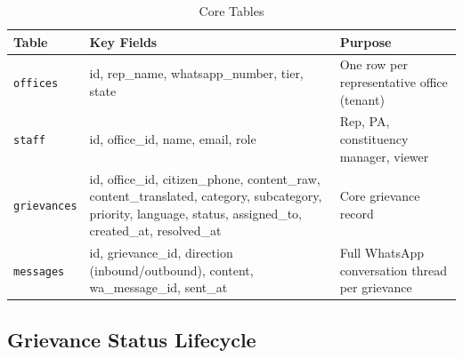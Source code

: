 \documentclass[12pt, a4paper]{article}
\begin{document}
\begin{table}[ht]
\centering
\caption{Core Tables}
\renewcommand{\arraystretch}{1.3}
\begin{tabularx}{\textwidth}{l l X}
\toprule
\rowcolor{pollitylightblue}
\textbf{Table} & \textbf{Key Fields} & \textbf{Purpose} \\
\midrule
\texttt{offices}    & id, rep\_name, whatsapp\_number, tier, state & One row per representative office (tenant) \\
\texttt{staff}      & id, office\_id, name, email, role & Rep, PA, constituency manager, viewer \\
\texttt{grievances} & id, office\_id, citizen\_phone, content\_raw, content\_translated, category, subcategory, priority, language, status, assigned\_to, created\_at, resolved\_at & Core grievance record \\
\texttt{messages}   & id, grievance\_id, direction (inbound/outbound), content, wa\_message\_id, sent\_at & Full WhatsApp conversation thread per grievance \\
\bottomrule
\end{tabularx}
\end{table}

\vspace{1em}

\subsection{Grievance Status Lifecycle}

\begin{center}
\end{center}
\end{document}
